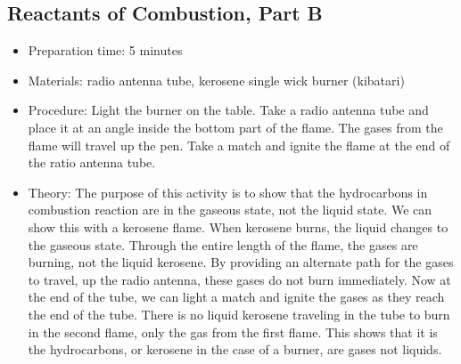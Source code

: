 \subsection{Reactants of Combustion, Part B}
\begin{itemize}
\item{Preparation time: 5 minutes}
\item{Materials: radio antenna tube, kerosene single wick burner (kibatari)}
\item{Procedure: Light the burner on the table. Take a radio antenna tube and place it at an angle inside the bottom part of the flame. The gases from the flame will travel up the pen. Take a match and ignite the flame at the end of the ratio antenna tube. }
\item{Theory: The purpose of this activity is to show that the hydrocarbons in combustion reaction are in the gaseous state, not the liquid state. We can show this with a kerosene flame. When kerosene burns, the liquid changes to the gaseous state. Through the entire length of the flame, the gases are burning, not the liquid kerosene. By providing an alternate path for the gases to travel, up the radio antenna, these gases do not burn immediately. Now at the end of the tube, we can light a match and ignite the gases as they reach the end of the tube. There is no liquid kerosene traveling in the tube to burn in the second flame, only the gas from the first flame. This shows that it is the hydrocarbons, or kerosene in the case of a burner, are gases not liquids.}
\end{itemize}

